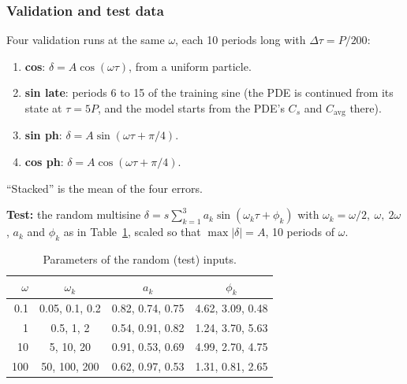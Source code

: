 \documentclass[11pt,a4paper]{article}
\newcommand{\avg}{\mathrm{avg}}
\begin{document}
\subsubsection{Validation and test data}
Four validation runs at the same $\omega$, each 10 periods long with $\Delta\tau=P/200$:
\begin{enumerate}
  \item \textbf{cos}: $\delta = A\cos(\omega\tau)$, from a uniform particle.
  \item \textbf{sin late}: periods 6 to 15 of the training sine (the PDE is continued from its state at $\tau=5P$, and the model starts from the PDE's $C_s$ and $C_\avg$ there).
  \item \textbf{sin ph}: $\delta = A\sin(\omega\tau+\pi/4)$.
  \item \textbf{cos ph}: $\delta = A\cos(\omega\tau+\pi/4)$.
\end{enumerate}
``Stacked'' is the mean of the four errors.

\textbf{Test:} the random multisine $\delta = s\sum_{k=1}^{3}a_k\sin(\omega_k\tau+\phi_k)$ with $\omega_k=\omega/2,\ \omega,\ 2\omega$, $a_k$ and $\phi_k$ as in Table~\ref{tab:random}, scaled so that $\max|\delta|=A$, 10 periods of $\omega$.
\begin{table}[H]\centering\small
\begin{tabular}{rccc}\toprule
$\omega$ & $\omega_k$ & $a_k$ & $\phi_k$\\\midrule
0.1 & 0.05, 0.1, 0.2 & 0.82, 0.74, 0.75 & 4.62, 3.09, 0.48\\
1 & 0.5, 1, 2 & 0.54, 0.91, 0.82 & 1.24, 3.70, 5.63\\
10 & 5, 10, 20 & 0.91, 0.53, 0.69 & 4.99, 2.70, 4.75\\
100 & 50, 100, 200 & 0.62, 0.97, 0.53 & 1.31, 0.81, 2.65\\\bottomrule
\end{tabular}
\caption{Parameters of the random (test) inputs.}
\label{tab:random}
\end{table}
\end{document}
